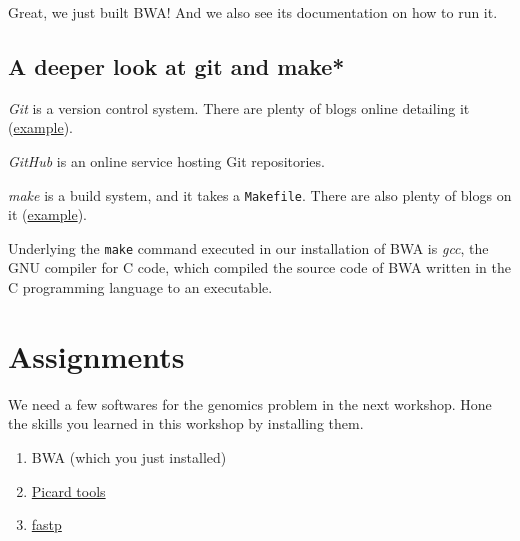 \documentclass[12pt,letterpaper]{article}
\begin{document}
Great, we just built BWA! And we also see its documentation on how to run it.

\subsection{A deeper look at git and make*}

\textit{Git} is a version control system. There are plenty of blogs online detailing it (\href{https://webtuu.com/blog/04/a-laymans-introduction-to-git}{example}).

\textit{GitHub} is an online service hosting Git repositories.

\textit{make} is a build system, and it takes a \texttt{Makefile}. There are also plenty of blogs on it (\href{https://matt.might.net/articles/intro-to-make/}{example}).

Underlying the \texttt{make} command executed in our installation of BWA is \textit{gcc}, the GNU compiler for C code, which compiled the source code of BWA written in the C programming language to an executable.

\section{Assignments}

We need a few softwares for the genomics problem in the next workshop. Hone the skills you learned in this workshop by installing them.

\begin{enumerate}
   \item BWA (which you just installed)
   \item \href{https://broadinstitute.github.io/picard/}{Picard tools}
   \item \href{https://github.com/OpenGene/fastp}{fastp}
\end{enumerate}
\end{document}
